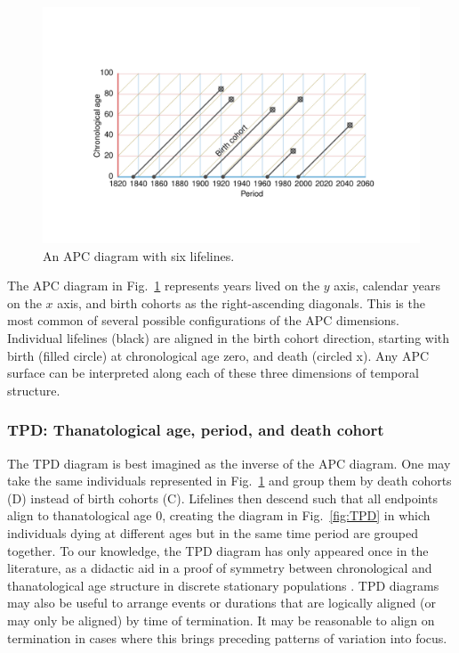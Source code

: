 \documentclass[12pt,oneside,a4paper,doublespacing]{article} %
\theoremstyle{definition}
\begin{document}
\begin{figure}[h!] 
\caption{An APC diagram with six lifelines.}
\label{fig:APC}
\centering
\vspace{-5em}
\includegraphics[scale=0.8]{Figures/APCrt.pdf}
\end{figure}

The APC diagram in Fig.~\ref{fig:APC} represents years lived on the $y$
axis, calendar years on the $x$ axis, and birth cohorts as the right-ascending
diagonals. This is the most common of several possible configurations
of the APC dimensions. Individual lifelines (black) are aligned in the birth
cohort direction, starting with birth (filled circle) at chronological age zero, and death
(circled x). Any APC surface can be interpreted along each of these
three dimensions of temporal structure. 

\FloatBarrier
\subsubsection{TPD: Thanatological age, period, and death cohort}
\label{sec:tpd}
The TPD diagram is best imagined as the inverse of the APC diagram. One may take
the same individuals represented in Fig.~\ref{fig:APC} and group them by death cohorts (D) instead
of birth cohorts (C). Lifelines then descend such that all
endpoints align to thanatological age 0, creating the diagram in
Fig.~\ref{fig:TPD} in which individuals dying at different ages but in the same time period are grouped together.
To our knowledge, the TPD diagram has only appeared once in the literature, as
a didactic aid in a proof of symmetry between chronological and thanatological
age structure in discrete stationary populations \citep{villavicencioRiffeSymmetires2016}. TPD
diagrams may also be useful to arrange events or durations that are logically
aligned (or may only be aligned) by time of termination. It may be reasonable to
align on termination in cases where this brings preceding patterns of
variation into focus.
\end{document}
